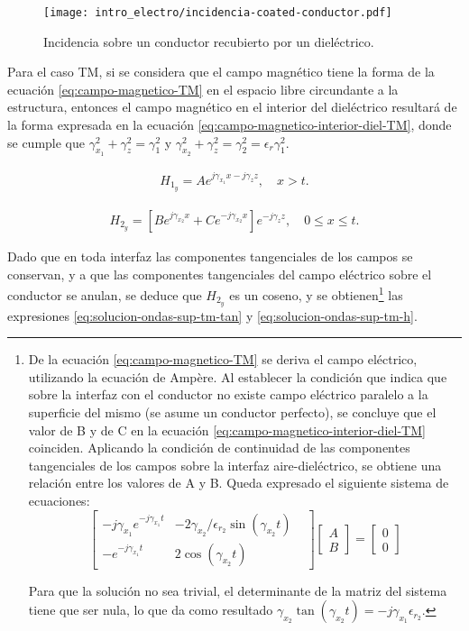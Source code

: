 \begin{figure}[htp]
	\centering
	\texttt{[image: intro\_electro/incidencia-coated-conductor.pdf]}
	\caption{Incidencia sobre un conductor recubierto por un dieléctrico.}
	\label{fig:thin-dielectric-coating}
\end{figure}

Para el caso TM, si se considera que el campo magnético tiene la forma de la ecuación \ref{eq:campo-magnetico-TM} en el espacio libre circundante a la estructura, entonces el campo magnético en el interior del dieléctrico resultará de la forma expresada en la ecuación \ref{eq:campo-magnetico-interior-diel-TM}, donde se cumple que $\gamma_{x_1}^2 + \gamma_z^2 = \gamma_1^2$ y $\gamma_{x_2}^2 + \gamma_z^2 = \gamma_2^2 = \epsilon_r \gamma_1^2$.

\begin{align}
	\label{eq:campo-magnetico-TM}
	H_{1_y} = A e^{j\gamma_{x_1} x - j \gamma_z z},\quad x>t.
\end{align}

\begin{align}
	\label{eq:campo-magnetico-interior-diel-TM}
	H_{2_y} = [B e^{j\gamma_{x_2} x} + C e^{-j\gamma_{x_2} x}] e^{-j\gamma_z z},\quad  0\leq x \leq t.
\end{align}

Dado que en toda interfaz las componentes tangenciales de los campos se conservan, y a que las componentes tangenciales del campo eléctrico sobre el conductor se anulan, se deduce que $H_{2_y}$ es un coseno, y se obtienen\footnote{De la ecuación \ref{eq:campo-magnetico-TM} se deriva el campo eléctrico, utilizando la ecuación de Ampère. Al establecer la condición que indica que sobre la interfaz con el conductor no existe campo eléctrico paralelo a la superficie del mismo (se asume un conductor perfecto), se concluye que el valor de B y de C en la ecuación \ref{eq:campo-magnetico-interior-diel-TM} coinciden. Aplicando la condición de continuidad de las componentes tangenciales de los campos sobre la interfaz aire-dieléctrico, se obtiene una relación entre los valores de A y B. Queda expresado el siguiente sistema de ecuaciones:
\begin{equation*}
	\begin{bmatrix}
		-j \gamma_{x_1} e^{-j \gamma_{x_1} t} & -2 \gamma_{x_2}/\epsilon_{r_2} \sin(\gamma_{x_2} t) &  \\
		 -e^{-j \gamma_{x_1} t} & 2 \cos (\gamma_{x_2} t)
	\end{bmatrix}
	\begin{bmatrix}
		A \\
		B
	\end{bmatrix}
	=
	\begin{bmatrix}
		0 \\
		0
	\end{bmatrix}
\end{equation*}

Para que la solución no sea trivial, el determinante de la matriz del sistema tiene que ser nula, lo que da como resultado $\gamma_{x_2} \tan (\gamma_{x_2} t) = -j \gamma_{x_1} \epsilon_{r_2}$.
} las expresiones \ref{eq:solucion-ondas-sup-tm-tan} y \ref{eq:solucion-ondas-sup-tm-h}.


